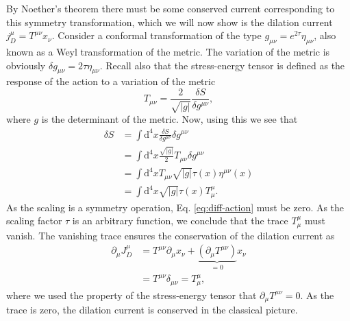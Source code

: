 By Noether's theorem there must be some conserved current corresponding to this symmetry transformation, which we will now show is the dilation current $j_D^{\mu } = T^{\mu \nu } x_{\nu }$.
Consider a conformal transformation of the type $g_{\mu \nu } = e^{2\tau } \eta _{\mu \nu }$, also known as a Weyl transformation of the metric.
The variation of the metric is obviously $\delta g_{\mu \nu } = 2 \tau \eta _{\mu \nu }$.
Recall also that the stress-energy tensor is defined as the response of the action to a variation of the metric
\begin{equation}
  T_{\mu \nu } = \frac{2}{\sqrt{|g|}} \frac{{\delta S}}{\delta  g^{\mu \nu }},
\end{equation}
where $g$ is the determinant of the metric.
Now, using this we see that
\begin{equation}
  \label{eq:diff-action}
  \begin{split}
    \delta  S &= \int \mathrm{d}^4x \frac{\delta S}{\delta g^{\mu \nu }} \delta g^{\mu \nu }\\
    &= \int \mathrm{d}^4x \frac{\sqrt{|g|}}{2 } T_{\mu \nu } \delta g^{\mu \nu }\\
    &= \int \mathrm{d}^4x T_{\mu \nu } \sqrt{|g|} \tau (x) \eta ^{\mu \nu }(x)\\
    &= \int \mathrm{d}^4x \sqrt{|g|} \tau (x) T^{\mu }_{\mu }.
  \end{split}
\end{equation}
As the scaling is a symmetry operation, Eq. \ref{eq:diff-action} must be zero.
As the scaling factor $\tau $ is an arbitrary function, we conclude that the trace $T^{\mu }_{\mu }$ must vanish.
The vanishing trace ensures the conservation of the dilation current as
\begin{align}
  \label{eq:dilation-diff}
  \partial _{\mu } J_D^{\mu } &= T^{\mu \nu }\partial_{\mu } x_\nu +
                                \underbrace{\left( \partial _{\mu }T^{\mu \nu } \right)}_{=0} x_{\nu }\\
  \nonumber &= T^{\mu \nu }\delta _{\mu \nu } = T^{\mu }_{\mu },
\end{align}
where we used the property of the stress-energy tensor that $\partial _{\mu }T^{\mu \nu } = 0$.
As the trace is zero, the dilation current is conserved in the classical picture.

